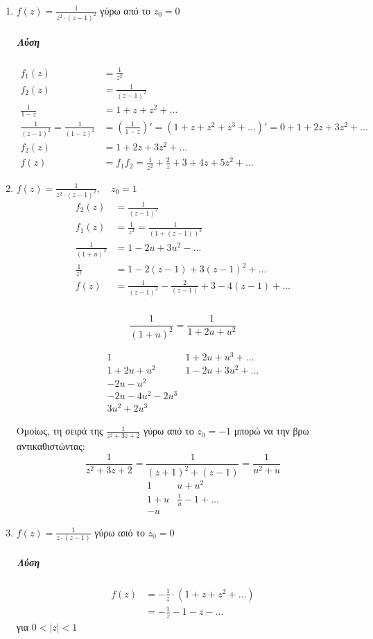 \documentclass[12pt,a4paper,notitlepage,fleqn]{article}
\begin{document}
\begin{enumerate}
  \item \( f(z) = \frac{1}{z^2\cdot(z-1)^2} \) γύρω από το \( z_0 = 0 \)
  \subparagraph{Λύση}
  \begin{align*}
  f_1(z) &= \frac{1}{z^2} \\
  f_2(z) &= \frac{1}{(z-1)^2} \\
  \frac{1}{1-z} &= 1 + z + z^2 + \dots \\
  \frac{1}{(z-1)^2} = \frac{1}{(1-z)^2} &= \left( \frac{1}{1-z} \right)' =
   (1+z+z^2+z^3+\dots)' =
   0+1+2z+3z^2+\dots
  \\ f_2(z) &= 1+2z+3z^2+\dots \\
  f(z) &= f_1f_2 = \frac{1}{z^2} + \frac{2}{z} + 3 + 4z + 5z^2 + \dots
  \end{align*}

  \item \( f(z) = \frac{1}{z^2\cdot(z-1)^2},\quad z_0 = 1 \)
  \begin{align*}
  f_2(z) &= \frac{1}{(z-1)^2} \\
  f_1(z) &= \frac{1}{z^2} = \frac{1}{\left(1+(z-1)\right)^2} \\
  \frac{1}{(1+u)^2} &= 1 - 2u + 3u^2 - \dots \\
  \frac{1}{z^2} &= 1-2(z-1)+3(z-1)^2 + \dots \\
  f(z) &= \frac{1}{(z-1)^2} - \frac{2}{(z-1)} + 3 - 4(z-1) + \dots
  \end{align*}

  \subparagraph{}
  \[
  \frac{1}{(1+u)^2} = \frac{1}{1+2u+u^2}
  \]

  \[
  \begin{array}{l|l}
  1 & 1+2u+u^3 + \dots \\ \hline
  1+2u+u^2 & 1-2u+3u^2+\dots \\
  -2u-u^2 & \\ -2u-4u^2-2u^3 & \\ 3u^2+2u^3
  \end{array}
  \]

  Ομοίως, τη σειρά της \( \frac{1}{z^2+3z+2} \) γύρω από το \( z_0 = -1 \) μπορώ
  να την βρω αντικαθιστώντας:
  \[
  \frac{1}{z^2+3z+2} = \frac{1}{(z+1)^2+(z-1)} = \frac{1}{u^2+u}
  \]\[
  \begin{array}{l|l}
  1 & u+u^2 \\ \hline
  1+u & \frac{1}{u} - 1 + \dots \\
  -u &
  \end{array}
  \]

  \item \( f(z) = \frac{1}{z\cdot(z-1)} \) γύρω από το \( z_0 = 0 \)
  \subparagraph{Λύση}
  \begin{align*}
  f(z) &= -\frac{1}{z}\cdot ( 1+z+z^2+\dots) \\
  &= -\frac{1}{z} - 1 - z - \dots
  \end{align*}
  για \( 0<|z|<1 \)


\end{enumerate}
\end{document}
